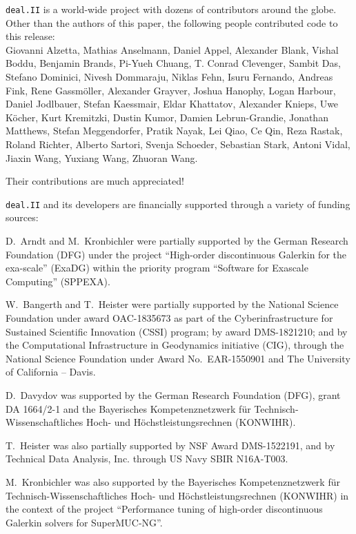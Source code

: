 \documentclass{ansarticle-preprint}
\newcommand{\specialword}[1]{\texttt{#1}}
\newcommand{\dealii}{{\specialword{deal.II}}\xspace}
\begin{document}
\dealii is a world-wide project with dozens of contributors around the
globe. Other than the authors of this paper, the following people
contributed code to this release:\\
  Giovanni Alzetta,
  Mathias Anselmann,
  Daniel Appel,
  Alexander Blank,
  Vishal Boddu,
  Benjamin Brands,
  Pi-Yueh Chuang,
  T. Conrad Clevenger,
  Sambit Das,
  Stefano Dominici,
  Nivesh Dommaraju,
  Niklas Fehn,
  Isuru Fernando,
  Andreas Fink,
  Rene Gassm{\"o}ller,
  Alexander Grayver,
  Joshua Hanophy,
  Logan Harbour,
  Daniel Jodlbauer,
  Stefan Kaessmair,
  Eldar Khattatov,
  Alexander Knieps,
  Uwe K{\"o}cher,
  Kurt Kremitzki,
  Dustin Kumor,
  Damien Lebrun-Grandie,
  Jonathan Matthews,
  Stefan Meggendorfer,
  Pratik Nayak,
  Lei Qiao,
  Ce Qin,
  Reza Rastak,
  Roland Richter,
  Alberto Sartori,
  Svenja Schoeder,
  Sebastian Stark,
  Antoni Vidal,
  Jiaxin Wang,
  Yuxiang Wang,
  Zhuoran Wang.

Their contributions are much appreciated!


\bigskip

\dealii and its developers are financially supported through a
variety of funding sources:

D.~Arndt and M.~Kronbichler were partially supported by the German
Research Foundation (DFG) under the project ``High-order discontinuous
Galerkin for the exa-scale'' (\mbox{ExaDG}) within the priority program ``Software
for Exascale Computing'' (SPPEXA).

W.~Bangerth and T.~Heister were partially
supported by the National Science Foundation under award OAC-1835673
as part of the Cyberinfrastructure for Sustained Scientific Innovation (CSSI)
program; by award DMS-1821210; and by the Computational Infrastructure
in Geodynamics initiative (CIG), through the National Science
Foundation under Award No.~EAR-1550901 and The
University of California -- Davis.

D.~Davydov was supported by the German Research Foundation (DFG), grant DA
1664/2-1 and the Bayerisches Kompetenznetzwerk
f\"ur Technisch-Wissenschaftliches Hoch- und H\"ochstleistungsrechnen
(KONWIHR).

T.~Heister was also partially supported by NSF Award DMS-1522191, and
by Technical Data Analysis, Inc. through US Navy SBIR N16A-T003.

M.~Kronbichler was also supported by the Bayerisches Kompetenznetzwerk
f\"ur Technisch-Wissen\-schaft\-li\-ches Hoch- und H\"ochstleistungsrechnen
(KONWIHR) in the context of the project
``Performance tuning of high-order discontinuous Galerkin solvers for
SuperMUC-NG''.
\end{document}
